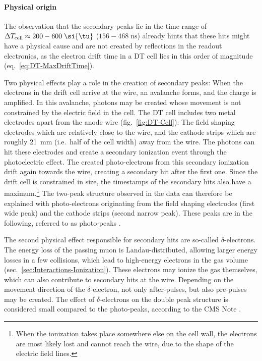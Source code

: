 \paragraph{Physical origin}
The observation that the secondary peaks lie in the time range of $\Delta T _\text{cell}\approx 200-600\;\si{\tu}$ ($156-468\;\si{\nano\second}$) already hints that these hits might have a physical cause and are not created by reflections in the readout electronics, as the electron drift time in a \ac{DT} cell lies in this order of magnitude (eq.\ \ref{eq:DT-MaxDriftTime}).
\par Two physical effects play a role in the creation of secondary peaks: When the electrons in the drift cell arrive at the wire, an avalanche forms, and the charge is amplified. In this avalanche, photons may be created whose movement is not constrained by the electric field in the cell. The \ac{DT} cell includes two metal electrodes apart from the anode wire (fig.\ \ref{fig:DT-Cell}): The field shaping electrodes which are relatively close to the wire, and the cathode strips which are roughly \SI{21}{\milli\meter} (i.e.\ half of the cell width) away from the wire. The photons can hit these electrodes and create a secondary ionization event through the photoelectric effect. The created photo-electrons from this secondary ionization drift again towards the wire, creating a secondary hit after the first one. Since the drift cell is constrained in size, the timestamps of the secondary hits also have a maximum.\footnote{When the ionization takes place somewhere else on the cell wall, the electrons are most likely lost and cannot reach the wire, due to the shape of the electric field lines.} The two-peak structure observed in the data can therefore be explained with photo-electrons originating from the field shaping electrodes (first wide peak) and the cathode strips (second narrow peak). These peaks are in the following, referred to as photo-peaks \cite{CMS-NOTE-2008-003}.
\par The second physical effect responsible for secondary hits are so-called $\delta$-electrons. The energy loss of the passing muon is Landau-distributed, allowing larger energy losses in a few collisions, which lead to high-energy electrons in the gas volume (sec.\ \ref{sec:Interactions-Ionization}). These electrons may ionize the gas themselves, which can also contribute to secondary hits at the wire. Depending on the movement direction of the $\delta$-electron, not only after-pulses, but also pre-pulses may be created. The effect of $\delta$-electrons on the double peak structure is considered small compared to the photo-peaks, according to the \ac{CMS} Note \cite{CMS-NOTE-2008-003}.

